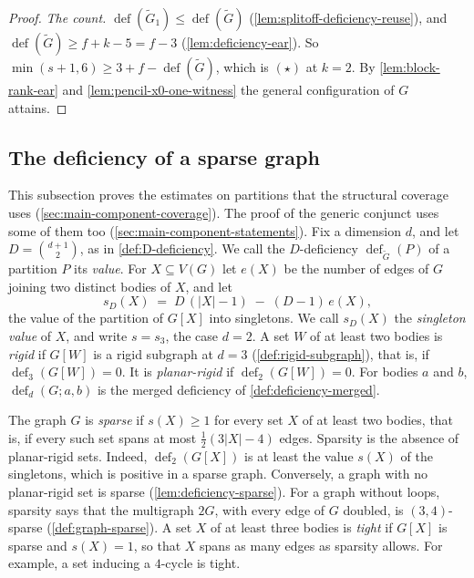 \begin{proof}
  \emph{The count.} $\operatorname{def}(\tilde G_1) \le
  \operatorname{def}(\tilde G)$ (\cref{lem:splitoff-deficiency-reuse}), and
  $\operatorname{def}(\tilde G) \ge f + k - 5 = f - 3$
  (\cref{lem:deficiency-ear}). So
  $\min(s + 1, 6) \ge 3 + f - \operatorname{def}(\tilde G)$, which is
  $(\star)$ at $k = 2$. By \cref{lem:block-rank-ear} and
  \cref{lem:pencil-x0-one-witness} the general configuration of $G$
  attains.
\end{proof}

\subsection{The deficiency of a sparse graph}
\label{sec:main-component-sparse}

This subsection proves the estimates on partitions that the structural
coverage uses (\cref{sec:main-component-coverage}). The proof of the
generic conjunct uses some of them too
(\cref{sec:main-component-statements}). Fix a dimension $d$, and let
$D = \binom{d+1}{2}$, as in \cref{def:D-deficiency}. We call the $D$-deficiency
$\operatorname{def}_{\tilde G}(P)$ of a partition $P$ its \emph{value}.
For $X \subseteq V(G)$ let $e(X)$ be the number of edges of $G$ joining
two distinct bodies of $X$, and let
\[
  s_D(X) \;=\; D\,(|X| - 1) \;-\; (D - 1)\,e(X),
\]
the value of the partition of $G[X]$ into singletons. We call $s_D(X)$
the \emph{singleton value} of $X$, and write $s = s_3$, the case
$d = 2$. A set $W$ of at least two bodies is \emph{rigid} if $G[W]$ is a
rigid subgraph at $d = 3$ (\cref{def:rigid-subgraph}), that is, if
$\operatorname{def}_3(G[W]) = 0$. It is \emph{planar-rigid} if
$\operatorname{def}_2(G[W]) = 0$. For bodies $a$ and $b$,
$\operatorname{def}_d(G; a, b)$ is the merged deficiency of
\cref{def:deficiency-merged}.

The graph $G$ is \emph{sparse} if $s(X) \ge 1$ for every set $X$ of at
least two bodies, that is, if every such set spans at most
$\frac12(3|X| - 4)$ edges. Sparsity is the absence of planar-rigid sets.
Indeed, $\operatorname{def}_2(G[X])$ is at least the value $s(X)$ of the
singletons, which is positive in a sparse graph. Conversely, a graph with
no planar-rigid set is sparse (\cref{lem:deficiency-sparse}). For a graph
without loops, sparsity says that the multigraph $2G$, with every edge of
$G$ doubled, is $(3, 4)$-sparse (\cref{def:graph-sparse}). A set $X$ of
at least three bodies is \emph{tight} if $G[X]$ is sparse and
$s(X) = 1$, so that $X$ spans as many edges as sparsity allows. For
example, a set inducing a $4$-cycle is tight.


